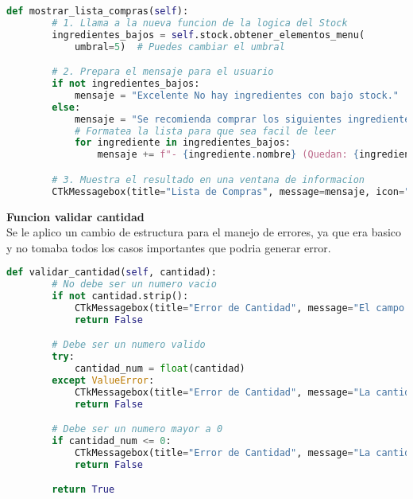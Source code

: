 \documentclass[a4paper,12pt]{article}
\begin{document}
\begin{lstlisting}[language=Python, caption={Nuevo codigo}, frame=single]
    def mostrar_lista_compras(self):
        # 1. Llama a la nueva funcion de la logica del Stock
        ingredientes_bajos = self.stock.obtener_elementos_menu(
            umbral=5)  # Puedes cambiar el umbral

        # 2. Prepara el mensaje para el usuario
        if not ingredientes_bajos:
            mensaje = "Excelente No hay ingredientes con bajo stock."
        else:
            mensaje = "Se recomienda comprar los siguientes ingredientes:\n\n"
            # Formatea la lista para que sea facil de leer
            for ingrediente in ingredientes_bajos:
                mensaje += f"- {ingrediente.nombre} (Quedan: {ingrediente.cantidad})\n"

        # 3. Muestra el resultado en una ventana de informacion
        CTkMessagebox(title="Lista de Compras", message=mensaje, icon="info")
\end{lstlisting}
\textbf{Funcion validar cantidad}\\
Se le aplico un cambio de estructura para el manejo de errores, ya que era basico y no tomaba todos los casos importantes que podria generar error.\\
\newpage
\begin{lstlisting}[language=Python, caption={Cambio de codigo}, frame=single]
    def validar_cantidad(self, cantidad):
        # No debe ser un numero vacio
        if not cantidad.strip():
            CTkMessagebox(title="Error de Cantidad", message="El campo de cantidad no puede estar vacio.", icon="cancel")
            return False

        # Debe ser un numero valido
        try:
            cantidad_num = float(cantidad)
        except ValueError:
            CTkMessagebox(title="Error de Cantidad", message="La cantidad debe ser un numero valido (ej: 10 o 5.5).", icon="cancel")
            return False

        # Debe ser un numero mayor a 0
        if cantidad_num <= 0:
            CTkMessagebox(title="Error de Cantidad", message="La cantidad debe ser un numero mayor que cero.", icon="cancel")
            return False

        return True
\end{lstlisting}
\end{document}
